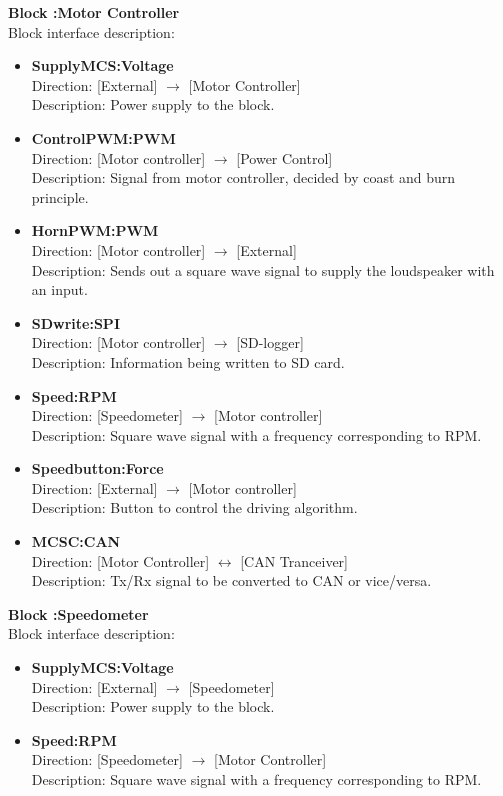 \textbf{Block :Motor Controller}\\
Block interface description:
\begin{itemize}
	\item \textbf{SupplyMCS:Voltage}\\
	Direction: [External] $\rightarrow$ [Motor Controller]\\
	Description: Power supply to the block.
	\item \textbf{ControlPWM:PWM}\\
	Direction: [Motor controller] $\rightarrow$ [Power Control]\\
	Description: Signal from motor controller, decided by  coast and burn principle. 
	\item \textbf{HornPWM:PWM}\\
	Direction: [Motor controller] $\rightarrow$ [External]\\
	Description: Sends out a square wave signal to supply the loudspeaker with an input.
	\item \textbf{SDwrite:SPI}\\
	Direction: [Motor controller] $\rightarrow$ [SD-logger]\\
	Description: Information being written to SD card.
	\item \textbf{Speed:RPM}\\
	Direction: [Speedometer] $\rightarrow$ [Motor controller]\\
	Description: Square wave signal with a frequency corresponding to RPM.
	\item \textbf{Speedbutton:Force}\\
	Direction: [External] $\rightarrow$ [Motor controller]\\
	Description: Button to control the driving algorithm.
	\item \textbf{MCSC:CAN}\\
	Direction: [Motor Controller] $\leftrightarrow$ [CAN Tranceiver]\\
	Description: Tx/Rx signal to be converted to CAN or vice/versa.
\end{itemize}

\textbf{Block :Speedometer}\\
Block interface description:
\begin{itemize}
	\item \textbf{SupplyMCS:Voltage}\\
	Direction: [External] $\rightarrow$ [Speedometer]\\
	Description: Power supply to the block.
	\item \textbf{Speed:RPM}\\
	Direction: [Speedometer] $\rightarrow$ [Motor Controller]\\
	Description: Square wave signal with a frequency corresponding to RPM.
\end{itemize}

